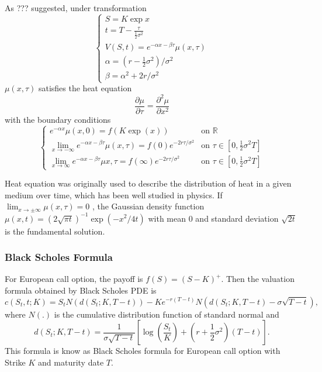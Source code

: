 \documentclass[11pt]{book}
\def\bR{{\mathbb{R}}}
\begin{document}
As ??? suggested, under transformation
\begin{equation}
\begin{cases}
S=K\exp{x} \\
t=T-\frac{\tau}{\frac{1}{2}\sigma ^2} \\
V(S,t)=e^{-\alpha x - \beta \tau } \mu(x, \tau)\\
\alpha=(r-\frac{1}{2} \sigma ^2) / \sigma ^2 \\
\beta= \alpha ^2 + 2r/{\sigma}^2
\end{cases}
\end{equation}
$\mu(x,\tau)$ satisfies the heat equation
\begin{equation}
\frac{\partial \mu}{\partial \tau} = \frac{\partial ^2 \mu}{\partial x^2}
\end{equation}
with the boundary conditions
\begin{equation}
\begin{cases}
e^{-\alpha x} \mu (x,0) = f(K \exp(x)) & \text{on } \bR \\
\displaystyle \lim_{x \to -\infty}e^{-\alpha x- \beta \tau } \mu(x,\tau) = f(0)e^{-2r\tau / \sigma ^2} &\text{on } \tau \in [0,\frac{1}{2}\sigma ^2 T] \\
\displaystyle \lim_{x \to \infty} e^{-\alpha x -\beta \tau } \mu{x,\tau}  = f(\infty) e^{-2r\tau / \sigma ^2} & \text{on } \tau \in [0, \frac{1}{2} \sigma ^2 T]
\end{cases}
\end{equation}

Heat equation was originally used to describe the distribution of heat in a given medium over time, which has been well studied in physics. If $\lim_{x\to \pm \infty} \mu (x, \tau)= 0$ , the Gaussian density function $\mu (x,t) = (2 \sqrt{\pi t} )^{-1} \exp(-x^2 /{4t})$ with mean $0$ and standard deviation $\sqrt {2t} $ is the fundamental solution.

\subsubsection{Black Scholes Formula}
For European call option, the payoff is $f(S)=(S-K)^+$. Then the valuation formula obtained by Black Scholes PDE is
\begin{equation}
c(S_t,t;K)=S_t N(d(S_t;K,T-t))-Ke^{-r(T-t)}N(d(S_t;K,T-t)-\sigma\sqrt{T-t}),
\end{equation}
where $N(.)$ is the cumulative distribution function of standard normal and
\begin{equation}
d(S_t;K,T-t)=\frac{1}{\sigma \sqrt{T-t}} [\log(\frac{S_t}{K}) + (r+\frac{1}{2}\sigma ^2)(T-t)].
\end{equation}
This formula is know as Black Scholes formula for European call option with Strike $K$ and maturity date $T$.
\end{document}
